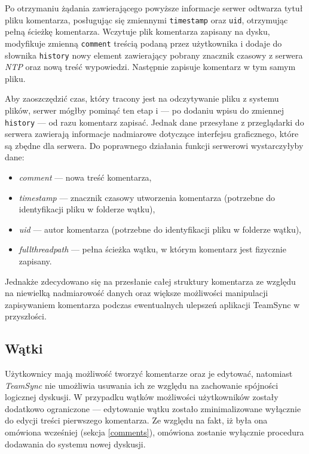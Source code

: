 Po otrzymaniu żądania zawierającego powyższe informacje serwer odtwarza tytuł pliku komentarza, posługując się zmiennymi \texttt{timestamp} oraz \texttt{uid}, otrzymując pełną ścieżkę komentarza. Wczytuje plik komentarza zapisany na dysku, modyfikuje zmienną \texttt{comment} treścią podaną przez użytkownika i dodaje do słownika \texttt{history} nowy element zawierający pobrany znacznik czasowy z serwera \emph{NTP} oraz nową treść wypowiedzi. Następnie zapisuje komentarz w tym samym pliku.

Aby zaoszczędzić czas, który tracony jest na odczytywanie pliku z systemu plików, serwer mógłby pominąć ten etap i --- po dodaniu wpisu do zmiennej \texttt{history} --- od razu komentarz zapisać. Jednak dane przesyłane z przeglądarki do serwera zawierają informacje nadmiarowe dotyczące interfejsu graficznego, które są zbędne dla serwera. Do poprawnego działania funkcji serwerowi wystarczyłyby dane:

\begin{itemize}[noitemsep]
  \item \emph{comment} --- nowa treść komentarza,
  
  \item \emph{timestamp} --- znacznik czasowy utworzenia komentarza (potrzebne do identyfikacji pliku w folderze wątku),
  
  \item \emph{uid} --- autor komentarza (potrzebne do identyfikacji pliku w folderze wątku),
  
  \item \emph{fullthreadpath} --- pełna ścieżka wątku, w którym komentarz jest fizycznie zapisany.
\end{itemize}

Jednakże zdecydowano się na przesłanie całej struktury komentarza ze względu na niewielką nadmiarowość danych oraz większe możliwości manipulacji zapisywaniem komentarza podczas ewentualnych ulepszeń aplikacji TeamSync w przyszłości.

\subsection{Wątki}

Użytkownicy mają możliwość tworzyć komentarze oraz je edytować, natomiast \emph{TeamSync} nie umożliwia usuwania ich ze względu na zachowanie spójności logicznej dyskusji. W przypadku wątków możliwości użytkowników zostały dodatkowo ograniczone --- edytowanie wątku zostało zminimalizowane wyłącznie do edycji treści pierwszego komentarza. Ze względu na fakt, iż była ona omówiona wcześniej (sekcja \ref{comments}), omówiona zostanie wyłącznie procedura dodawania do systemu nowej dyskusji.


